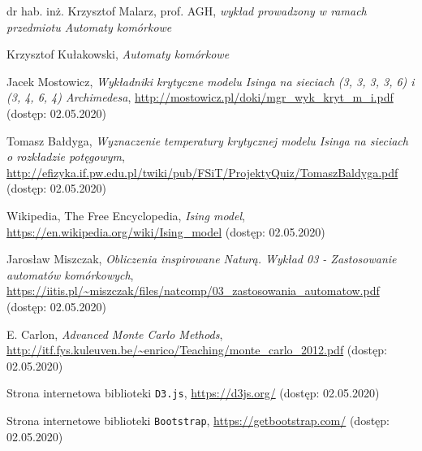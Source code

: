 \documentclass[11pt] {article}
\begin{document}
\newpage

\begin{thebibliography}{9}

  dr hab. inż. Krzysztof Malarz, prof. AGH,
  \emph{wykład prowadzony w ramach przedmiotu Automaty komórkowe}

  Krzysztof Kułakowski,
  \emph{Automaty komórkowe}

  Jacek Mostowicz, 
  \emph{Wykładniki krytyczne modelu Isinga na sieciach (3, 3, 3, 3, 6) i (3, 4, 6, 4) Archimedesa},
  \url{http://mostowicz.pl/doki/mgr_wyk_kryt_m_i.pdf} (dostęp: 02.05.2020)


  Tomasz Bałdyga,
  \emph{Wyznaczenie temperatury krytycznej modelu Isinga na sieciach o rozkładzie potęgowym},
  \url{http://efizyka.if.pw.edu.pl/twiki/pub/FSiT/ProjektyQuiz/TomaszBaldyga.pdf} (dostęp: 02.05.2020)

  Wikipedia, The Free Encyclopedia,
  \emph{Ising model},
  \url{https://en.wikipedia.org/wiki/Ising_model} (dostęp: 02.05.2020)

  Jarosław Miszczak,
  \emph{Obliczenia inspirowane Naturą. Wykład 03 - Zastosowanie automatów komórkowych},
  \url{https://iitis.pl/~miszczak/files/natcomp/03_zastosowania_automatow.pdf} (dostęp: 02.05.2020)

  E. Carlon,
  \emph{Advanced Monte Carlo Methods},
  \url{http://itf.fys.kuleuven.be/~enrico/Teaching/monte_carlo_2012.pdf} (dostęp: 02.05.2020)

  Strona internetowa biblioteki \lstinline{D3.js},
  \url{https://d3js.org/} (dostęp: 02.05.2020)

  Strona internetowe biblioteki \lstinline{Bootstrap},
  \url{https://getbootstrap.com/} (dostęp: 02.05.2020)


\end{thebibliography}
\end{document}
